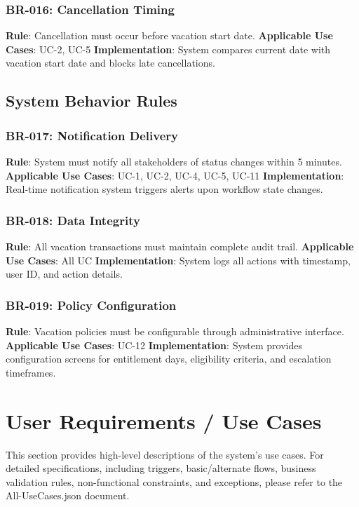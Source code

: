 \documentclass[12pt,a4paper]{article}
\begin{document}
\subsubsection{BR-016: Cancellation Timing}
\textbf{Rule}: Cancellation must occur before vacation start date.
\textbf{Applicable Use Cases}: UC-2, UC-5
\textbf{Implementation}: System compares current date with vacation start date and blocks late cancellations.

\subsection{System Behavior Rules}

\subsubsection{BR-017: Notification Delivery}
\textbf{Rule}: System must notify all stakeholders of status changes within 5 minutes.
\textbf{Applicable Use Cases}: UC-1, UC-2, UC-4, UC-5, UC-11
\textbf{Implementation}: Real-time notification system triggers alerts upon workflow state changes.

\subsubsection{BR-018: Data Integrity}
\textbf{Rule}: All vacation transactions must maintain complete audit trail.
\textbf{Applicable Use Cases}: All UC
\textbf{Implementation}: System logs all actions with timestamp, user ID, and action details.

\subsubsection{BR-019: Policy Configuration}
\textbf{Rule}: Vacation policies must be configurable through administrative interface.
\textbf{Applicable Use Cases}: UC-12
\textbf{Implementation}: System provides configuration screens for entitlement days, eligibility criteria, and escalation timeframes.

\section{User Requirements / Use Cases}

This section provides high-level descriptions of the system's use cases. For detailed specifications, including triggers, basic/alternate flows, business validation rules, non-functional constraints, and exceptions, please refer to the All-UseCases.json document.
\end{document}
